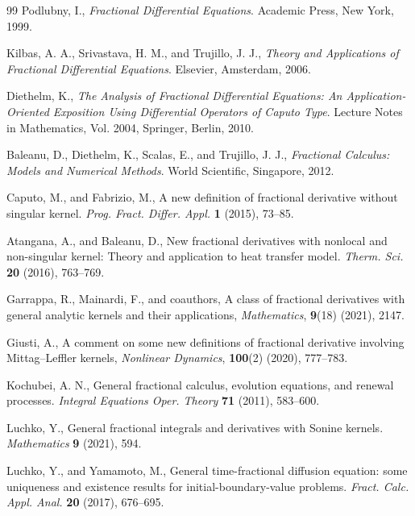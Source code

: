 \documentclass[11pt]{article}
\numberwithin{equation}{section}
\begin{document}
{\small

\begin{thebibliography}{99}
Podlubny, I.,
\textit{Fractional Differential Equations}.
Academic Press, New York, 1999.

Kilbas, A. A., Srivastava, H. M., and Trujillo, J. J.,
\textit{Theory and Applications of Fractional Differential Equations}.
Elsevier, Amsterdam, 2006.

Diethelm, K.,
\textit{The Analysis of Fractional Differential Equations:
An Application-Oriented Exposition Using Differential Operators of Caputo Type}.
Lecture Notes in Mathematics, Vol. 2004,
Springer, Berlin, 2010.

Baleanu, D., Diethelm, K., Scalas, E., and Trujillo, J. J.,
\textit{Fractional Calculus: Models and Numerical Methods}.
World Scientific, Singapore, 2012.

Caputo, M., and Fabrizio, M.,
A new definition of fractional derivative without singular kernel.
\textit{Prog. Fract. Differ. Appl.}
\textbf{1} (2015), 73--85.

Atangana, A., and Baleanu, D.,
New fractional derivatives with nonlocal and non-singular kernel:
Theory and application to heat transfer model.
\textit{Therm. Sci.}
\textbf{20} (2016), 763--769.


Garrappa, R., Mainardi, F., and coauthors,
A class of fractional derivatives with general analytic kernels and their applications,
\emph{Mathematics}, \textbf{9}(18) (2021), 2147.





Giusti, A.,
A comment on some new definitions of fractional derivative involving Mittag--Leffler kernels,
\emph{Nonlinear Dynamics}, \textbf{100}(2) (2020), 777--783.






Kochubei, A. N.,
General fractional calculus, evolution equations, and renewal processes.
\textit{Integral Equations Oper. Theory}
\textbf{71} (2011), 583--600.

Luchko, Y.,
General fractional integrals and derivatives with Sonine kernels.
\textit{Mathematics}
\textbf{9} (2021), 594.

Luchko, Y., and Yamamoto, M.,
General time-fractional diffusion equation:
some uniqueness and existence results for initial-boundary-value problems.
\textit{Fract. Calc. Appl. Anal.}
\textbf{20} (2017), 676--695.


\end{thebibliography}}
\end{document}
